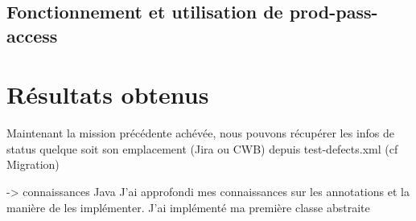 \subsection{Fonctionnement et utilisation de prod-pass-access}







\section{Résultats obtenus}
Maintenant la mission précédente achévée, nous pouvons récupérer les infos de status quelque soit son emplacement (Jira ou CWB) depuis test-defects.xml (cf Migration)



-> connaissances Java
J'ai approfondi mes connaissances sur les annotations et la manière de les implémenter.
J'ai implémenté ma première classe abstraite 

